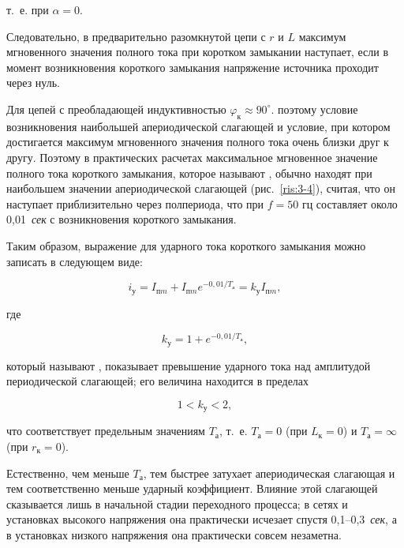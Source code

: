 т.~е. при $ \alpha = 0 $.

Следовательно, в предварительно разомкнутой цепи с $ r $ и $ L $ максимум мгновенного значения полного тока при коротком замыкании наступает, если в момент возникновения короткого
замыкания напряжение источника проходит через нуль.

Для цепей с преобладающей индуктивностью $ \varphi_{\text{к}} \approx 90^\circ $. поэтому условие возникновения наибольшей апериодической слагающей и условие, при котором достигается максимум мгновенного значения полного тока очень близки друг к другу. Поэтому в практических расчетах максимальное мгновенное значение полного тока короткого замыкания, которое называют ,   обычно находят при наибольшем значении апериодической слагающей (рис.~\ref{ris:3-4}), считая, что он наступает приблизительно через полпериода, что при $ f = 50 \textit{~гц} $ составляет около 0,01~\textit{сек} с возникновения короткого замыкания.

Таким образом, выражение для ударного тока короткого замыкания можно записать в следующем виде:

\begin{equation}
	i_{\text{у}} = I_{\text{п}m} + I_{\text{п}m} e^{-0,01 / T_{\text{а}}} = k_{\text{у}} I_{\text{п}m},
	\label{eq:3-7 i_y}
\end{equation}

где

\begin{equation}
	k_{\text{у}} = 1 + e^{-0,01 / T_{\text{а}}},
	\label{eq:3-8 k_y}
\end{equation}

который называют , показывает превышение ударного тока над амплитудой периодической слагающей; его величина находится в пределах

\begin{equation*}
	1 < k_{\text{у}} < 2,
\end{equation*}

что соответствует предельным значениям $ T_{\text{а}} $, т.~е. $ T_{\text{а}} = 0 $ (при $ L_{\text{к}} = 0 $)  и $ T_{\text{а}} = \infty $ (при $ r_{\text{к}} = 0 $).

Естественно, чем меньше $ T_{\text{а}} $, тем быстрее затухает апериодическая слагающая и тем соответственно меньше ударный коэффициент. Влияние этой слагающей сказывается лишь в начальной стадии переходного процесса; в сетях и установках высокого напряжения она практически исчезает спустя 0,1--0,3~\textit{сек}, а в установках низкого напряжения она практически совсем незаметна.

